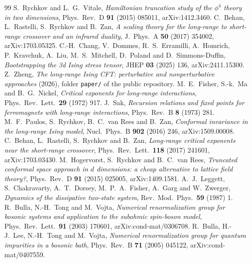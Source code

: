 \documentclass[11pt]{article}
\begin{document}









\appendix


\begin{thebibliography}{99}
 S.~Rychkov and L.~G.~Vitale, \emph{Hamiltonian truncation study of the $\phi^4$ theory in two dimensions}, Phys.\ Rev.\ D \textbf{91} (2015) 085011, arXiv:1412.3460.
 C.~Behan, L.~Rastelli, S.~Rychkov and B.~Zan, \emph{A scaling theory for the long-range to short-range crossover and an infrared duality}, J.\ Phys.\ A \textbf{50} (2017) 354002, arXiv:1703.05325.
 C.-H.~Chang, V.~Dommes, R.~S.~Erramilli, A.~Homrich, P.~Kravchuk, A.~Liu, M.~S.~Mitchell, D.~Poland and D.~Simmons-Duffin, \emph{Bootstrapping the 3d Ising stress tensor}, JHEP \textbf{03} (2025) 136, arXiv:2411.15300.
 Z.~Zheng, \emph{The long-range Ising CFT: perturbative and nonperturbative approaches} (2026), folder \texttt{paper/} of the public repository.
 M.~E.~Fisher, S.-k.~Ma and B.~G.~Nickel, \emph{Critical exponents for long-range interactions}, Phys.\ Rev.\ Lett.\ \textbf{29} (1972) 917.
 J.~Sak, \emph{Recursion relations and fixed points for ferromagnets with long-range interactions}, Phys.\ Rev.\ B \textbf{8} (1973) 281.
 M.~F.~Paulos, S.~Rychkov, B.~C.~van Rees and B.~Zan, \emph{Conformal invariance in the long-range Ising model}, Nucl.\ Phys.\ B \textbf{902} (2016) 246, arXiv:1509.00008.
 C.~Behan, L.~Rastelli, S.~Rychkov and B.~Zan, \emph{Long-range critical exponents near the short-range crossover}, Phys.\ Rev.\ Lett.\ \textbf{118} (2017) 241601, arXiv:1703.03430.
 M.~Hogervorst, S.~Rychkov and B.~C.~van Rees, \emph{Truncated conformal space approach in $d$ dimensions: a cheap alternative to lattice field theory?}, Phys.\ Rev.\ D \textbf{91} (2015) 025005, arXiv:1409.1581.
 A.~J.~Leggett, S.~Chakravarty, A.~T.~Dorsey, M.~P.~A.~Fisher, A.~Garg and W.~Zwerger, \emph{Dynamics of the dissipative two-state system}, Rev.\ Mod.\ Phys.\ \textbf{59} (1987) 1.
 R.~Bulla, N.-H.~Tong and M.~Vojta, \emph{Numerical renormalization group for bosonic systems and application to the subohmic spin-boson model}, Phys.\ Rev.\ Lett.\ \textbf{91} (2003) 170601, arXiv:cond-mat/0306708.
 R.~Bulla, H.-J.~Lee, N.-H.~Tong and M.~Vojta, \emph{Numerical renormalization group for quantum impurities in a bosonic bath}, Phys.\ Rev.\ B \textbf{71} (2005) 045122, arXiv:cond-mat/0407559.

\end{thebibliography}
\end{document}
